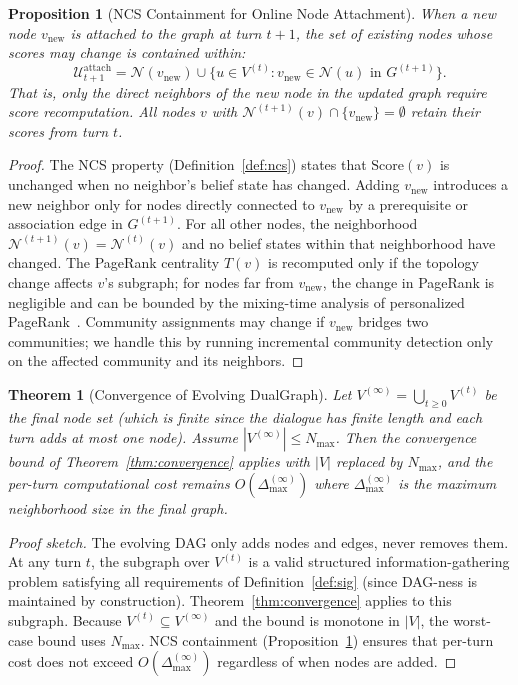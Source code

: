 \documentclass[11pt,a4paper]{article}
\newtheorem{theorem}{Theorem}
\newtheorem{proposition}{Proposition}
\begin{document}
\begin{proposition}[NCS Containment for Online Node Attachment]
\label{prop:evolving_ncs}
When a new node $v_{\mathrm{new}}$ is attached to the graph at turn $t+1$,
the set of existing nodes whose scores may change is contained within:
\[
  \mathcal{U}_{t+1}^{\mathrm{attach}} = \mathcal{N}(v_{\mathrm{new}})
    \cup \bigl\{u \in V^{(t)} : v_{\mathrm{new}} \in \mathcal{N}(u)
    \text{ in } G^{(t+1)}\bigr\}.
\]
That is, only the direct neighbors of the new node in the updated graph
require score recomputation. All nodes $v$ with
$\mathcal{N}^{(t+1)}(v) \cap \{v_{\mathrm{new}}\} = \emptyset$ retain
their scores from turn $t$.
\end{proposition}

\begin{proof}
The NCS property (Definition~\ref{def:ncs}) states that
$\mathrm{Score}(v)$ is unchanged when no neighbor's belief state has
changed. Adding $v_{\mathrm{new}}$ introduces a new neighbor only for
nodes directly connected to $v_{\mathrm{new}}$ by a prerequisite or
association edge in $G^{(t+1)}$. For all other nodes, the neighborhood
$\mathcal{N}^{(t+1)}(v) = \mathcal{N}^{(t)}(v)$ and no belief states
within that neighborhood have changed. The PageRank centrality $T(v)$ is
recomputed only if the topology change affects $v$'s subgraph; for nodes
far from $v_{\mathrm{new}}$, the change in PageRank is negligible and can
be bounded by the mixing-time analysis of personalized
PageRank~\cite{page1999pagerank}. Community assignments may change if
$v_{\mathrm{new}}$ bridges two communities; we handle this by running
incremental community detection only on the affected community and its
neighbors.
\end{proof}

\begin{theorem}[Convergence of Evolving DualGraph]
\label{thm:evolving_convergence}
Let $V^{(\infty)} = \bigcup_{t \geq 0} V^{(t)}$ be the final node set
(which is finite since the dialogue has finite length and each turn adds at
most one node). Assume $|V^{(\infty)}| \leq N_{\max}$. Then the convergence
bound of Theorem~\ref{thm:convergence} applies with $|V|$ replaced by
$N_{\max}$, and the per-turn computational cost remains
$O(\Delta_{\max}^{(\infty)})$ where $\Delta_{\max}^{(\infty)}$ is the
maximum neighborhood size in the final graph.
\end{theorem}

\begin{proof}[Proof sketch]
The evolving DAG only adds nodes and edges, never removes them. At any
turn $t$, the subgraph over $V^{(t)}$ is a valid structured
information-gathering problem satisfying all requirements of
Definition~\ref{def:sig} (since DAG-ness is maintained by construction).
Theorem~\ref{thm:convergence} applies to this subgraph. Because
$V^{(t)} \subseteq V^{(\infty)}$ and the bound is monotone in $|V|$,
the worst-case bound uses $N_{\max}$. NCS containment
(Proposition~\ref{prop:evolving_ncs}) ensures that per-turn cost does not
exceed $O(\Delta_{\max}^{(\infty)})$ regardless of when nodes are added.
\end{proof}
\end{document}
